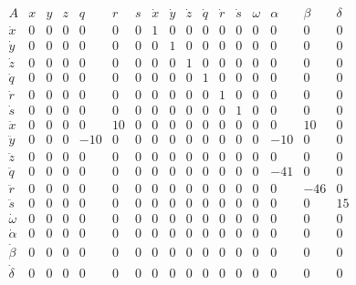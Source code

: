 $$ \begin{array}{ccccccccccccccccc} A& x& y& z& q& r& s& \dot{x}& \dot{y}& \dot{z}& \dot{q}& \dot{r}& \dot{s}& \omega& \alpha& \beta& \delta\\
    \dot{x}& 0& 0& 0& 0& 0& 0& 1& 0& 0& 0& 0& 0& 0& 0& 0& 0\\ \dot{y}& 0& 0& 0& 0& 0& 0& 0& 1& 0& 0& 0& 0& 0& 0& 0& 0\\ \dot{z}& 0& 0& 0& 0& 0& 0&
    0& 0& 1& 0& 0& 0& 0& 0& 0& 0\\ \dot{q}& 0& 0& 0& 0& 0& 0& 0& 0& 0& 1& 0& 0& 0& 0& 0& 0\\ \dot{r}& 0& 0& 0& 0& 0& 0& 0& 0& 0& 0& 1& 0& 0& 0& 0&
    0\\ \dot{s}& 0& 0& 0& 0& 0& 0& 0& 0& 0& 0& 0& 1& 0& 0& 0& 0\\ \ddot{x}& 0& 0& 0& 0& 10& 0& 0& 0& 0& 0& 0& 0& 0& 0& 10& 0\\ \ddot{y}& 0& 0& 0&
    -10& 0& 0& 0& 0& 0& 0& 0& 0& 0& -10& 0& 0\\ \ddot{z}& 0& 0& 0& 0& 0& 0& 0& 0& 0& 0& 0& 0& 0& 0& 0& 0\\ \ddot{q}& 0& 0& 0& 0& 0& 0& 0& 0& 0& 0&
    0& 0& 0& -41& 0& 0\\ \ddot{r}& 0& 0& 0& 0& 0& 0& 0& 0& 0& 0& 0& 0& 0& 0& -46& 0\\ \ddot{s}& 0& 0& 0& 0& 0& 0& 0& 0& 0& 0& 0& 0& 0& 0& 0& 15\\
    \dot{\omega}& 0& 0& 0& 0& 0& 0& 0& 0& 0& 0& 0& 0& 0& 0& 0& 0\\ \dot{\alpha}& 0& 0& 0& 0& 0& 0& 0& 0& 0& 0& 0& 0& 0& 0& 0& 0\\ \dot{\beta}& 0&
    0& 0& 0& 0& 0& 0& 0& 0& 0& 0& 0& 0& 0& 0& 0\\ \dot{\delta}& 0& 0& 0& 0& 0& 0& 0& 0& 0& 0& 0& 0& 0& 0& 0& 0\\ \end{array}
$$

